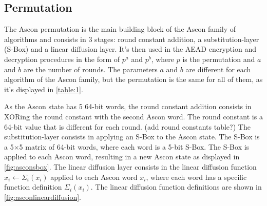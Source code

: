 \documentclass[11pt,twoside]{article}
\begin{document}
\subsection{Permutation}

The Ascon permutation is the main building block of the Ascon family of algorithms and consists in 3 stages: round constant addition, a substitution-layer (S-Box) and a linear diffusion layer. It's then used in the AEAD encryption and decryption procedures in the form of $p^a$ and $p^b$, where $p$ is the permutation and $a$ and $b$ are the number of rounds. The parameters $a$ and $b$ are different for each algorithm of the Ascon family, but the permutation is the same for all of them, as it's displayed in \cref{table:1}.

As the Ascon state has 5 64-bit words, the round constant addition consists in XORing the round constant with the second Ascon word. The round constant is a 64-bit value that is different for each round. \color{orange} (add round constants table?) \color{black} The substitution-layer consists in applying an S-Box to the Ascon state. The S-Box is a 5×5 matrix of 64-bit words, where each word is a 5-bit S-Box. The S-Box is applied to each Ascon word, resulting in a new Ascon state as displayed in \cref{fig:asconsbox}. The linear diffusion layer consists in the linear diffusion function $x_i \leftarrow \Sigma_i(x_i)$ applied to each Ascon word $x_i$, where each word has a specific function definition $\Sigma_i(x_i)$. The linear diffusion function definitions are shown in \cref{fig:asconlineardiffusion}.
\end{document}
